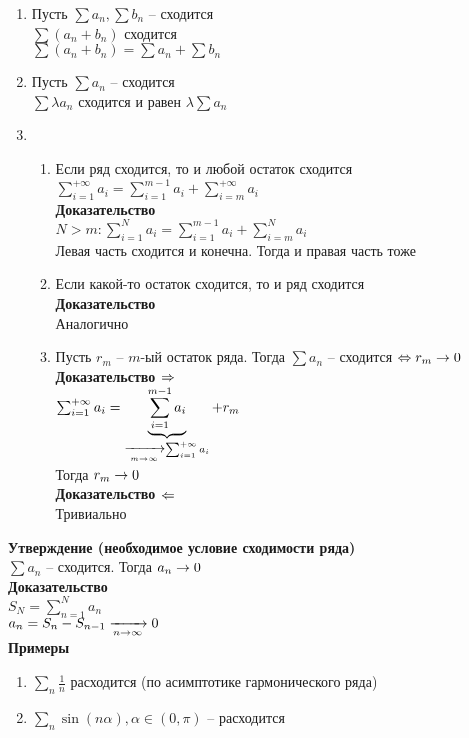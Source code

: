 \documentclass[12pt]{article}
\begin{document}
\begin{enumerate}
    \item Пусть $\sum a_n, \sum b_n$ -- сходится\\
    $\sum (a_n + b_n)$ сходится\\
    $\sum (a_n + b_n) = \sum a_n + \sum b_n$
    \item Пусть $\sum a_n$ -- сходится\\
    $\sum \lambda a_n$ сходится и равен $\lambda\sum a_n$
    \item \begin{enumerate}
        \item Если ряд сходится, то и любой остаток сходится\\
        $\sum_{i=1}^{+\infty} a_i = \sum_{i=1}^{m-1} a_i + \sum_{i=m}^{+\infty} a_i$\\
        \textbf{Доказательство}\\
        $N > m: \sum_{i=1}^N a_i = \sum_{i=1}^{m-1} a_i + \sum_{i=m}^N a_i$\\
        Левая часть сходится и конечна. Тогда и правая часть тоже
        \item Если какой-то остаток сходится, то и ряд сходится\\
        \textbf{Доказательство}\\
        Аналогично
        \item Пусть $r_m$ -- $m$-ый остаток ряда. Тогда $\sum a_n$ -- сходится $\LRto r_m \rto 0$\\
        \textbf{Доказательство $\Rto$}\\
        $\sum_{i=1}^{+\infty} a_i = \ub{\xrto[m\rto \infty]{} \sum_{i=1}^{+\infty} a_i}{\sum_{i=1}^{m-1} a_i} + r_m$\\
        Тогда $r_m \rto 0$\\
        \textbf{Доказательство $\Lto$}\\
        Тривиально
    \end{enumerate} 
\end{enumerate}
\textbf{Утверждение (необходимое условие сходимости ряда)}\\
$\sum a_n$ -- сходится. Тогда $a_n \rto 0$\\
\textbf{Доказательство}\\
$S_N = \sum_{n=1}^N a_n$\\
$a_n = S_n - S_{n-1} \xrto[n\rto \infty]{} 0$\\
\textbf{Примеры}
\begin{enumerate}
    \item $\sum_n \frac1n$ расходится (по асимптотике гармонического ряда)
    \item $\sum_n \sin (n\alpha), \alpha\in (0,\pi)$ -- расходится
\end{enumerate}
\end{document}
